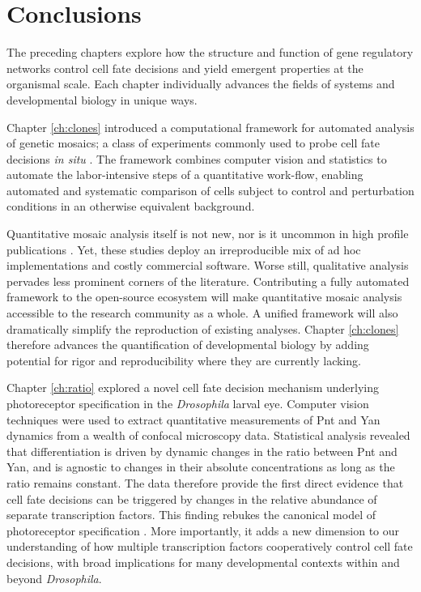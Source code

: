 \chapter{Conclusions}
\label{ch:conclusion}

The preceding chapters explore how the structure and function of gene regulatory networks control cell fate decisions and yield emergent properties at the organismal scale. Each chapter individually advances the fields of systems and developmental biology in unique ways.

Chapter \ref{ch:clones} introduced a computational framework for automated analysis of genetic mosaics; a class of experiments commonly used to probe cell fate decisions \textit{in situ} \cite{Germani2018,Atkins2019}. The framework combines computer vision and statistics to automate the labor-intensive steps of a quantitative work-flow, enabling automated and systematic comparison of cells subject to control and perturbation conditions in an otherwise equivalent background.

Quantitative mosaic analysis itself is not new, nor is it uncommon in high profile publications \cite{Dai2017,Gavish2016,Li2018}. Yet, these studies deploy an irreproducible mix of ad hoc implementations and costly commercial software. Worse still, qualitative analysis pervades less prominent corners of the literature. Contributing a fully automated framework to the open-source ecosystem will make quantitative mosaic analysis accessible to the research community as a whole. A unified framework will also dramatically simplify the reproduction of existing analyses. Chapter \ref{ch:clones} therefore advances the quantification of developmental biology by adding potential for rigor and reproducibility where they are currently lacking.

Chapter \ref{ch:ratio} explored a novel cell fate decision mechanism underlying photoreceptor specification in the \textit{Drosophila} larval eye. Computer vision techniques were used to extract quantitative measurements of Pnt and Yan dynamics from a wealth of confocal microscopy data. Statistical analysis revealed that differentiation is driven by dynamic changes in the ratio between Pnt and Yan, and is agnostic to changes in their absolute concentrations as long as the ratio remains constant. The data therefore provide the first direct evidence that cell fate decisions can be triggered by changes in the relative abundance of separate transcription factors. This finding rebukes the canonical model of photoreceptor specification \cite{Graham2010}. More importantly, it adds a new dimension to our understanding of how multiple transcription factors cooperatively control cell fate decisions, with broad implications for many developmental contexts within and beyond \textit{Drosophila}. 

